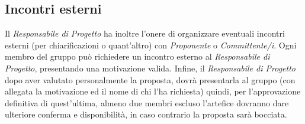 \subsection{Incontri esterni}
Il \textit{Responsabile di Progetto} ha inoltre l'onere di organizzare eventuali incontri esterni (per chiarificazioni o quant'altro) con \textit{Proponente} o \textit{Committente/i}. Ogni membro del gruppo può richiedere un incontro esterno al \textit{Responsabile di Progetto}, presentando una motivazione valida.
Infine, il \textit{Responsabile di Progetto} dopo aver valutato personalmente la proposta, dovrà presentarla al gruppo (con allegata la motivazione ed il nome di chi l'ha richiesta) quindi, per l'approvazione definitiva di quest'ultima, almeno due membri escluso l'artefice dovranno dare ulteriore conferma e disponibilità, in caso contrario la proposta sarà bocciata.